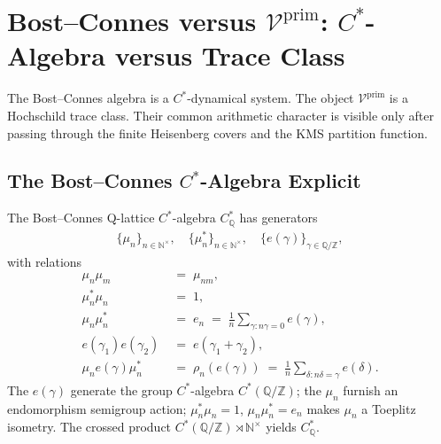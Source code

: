 \chapter{Bost--Connes versus \(\mathcal{V}^{\mathrm{prim}}\): \(C^{*}\)-Algebra versus Trace Class}
\label{v4-arith:connes-soibelman}

The Bost--Connes algebra is a \(C^*\)-dynamical system. The object
\(\mathcal V^{\mathrm{prim}}\) is a Hochschild trace class. Their
common arithmetic character is visible only after passing through the
finite Heisenberg covers and the KMS partition function.

\section{The Bost--Connes \(C^{*}\)-Algebra Explicit}
\label{v4-arith:cs:bost-connes-explicit}

\begin{definition}
\label{v4-arith:def:bost-connes-algebra}
The Bost--Connes Q-lattice \(C^{*}\)-algebra \(C_{\mathbb{Q}}^{*}\) has
generators
\begin{align}
\{\mu_{n}\}_{n\in\mathbb{N}^{\times}},\quad
\{\mu_{n}^{*}\}_{n\in\mathbb{N}^{\times}},\quad
\{e(\gamma)\}_{\gamma\in\mathbb{Q}/\mathbb{Z}},
\end{align}
with relations
\begin{align}
\mu_{n}\mu_{m}\;&=\;\mu_{nm}, \\
\mu_{n}^{*}\mu_{n}\;&=\;1, \\
\mu_{n}\mu_{n}^{*}\;&=\;e_{n}\;=\;\frac{1}{n}\sum_{\gamma:n\gamma=0}e(\gamma), \\
e(\gamma_{1})e(\gamma_{2})\;&=\;e(\gamma_{1}+\gamma_{2}), \\
\mu_{n}e(\gamma)\mu_{n}^{*}\;&=\;\rho_{n}(e(\gamma))\;=\;\frac{1}{n}\sum_{\delta:n\delta=\gamma}e(\delta).
\end{align}
The \(e(\gamma)\) generate the group \(C^{*}\)-algebra
\(C^{*}(\mathbb{Q}/\mathbb{Z})\); the \(\mu_{n}\) furnish an endomorphism
semigroup action; \(\mu_{n}^{*}\mu_{n}=1\), \(\mu_{n}\mu_{n}^{*}=e_{n}\)
makes \(\mu_{n}\) a Toeplitz isometry. The crossed product
\(C^{*}(\mathbb{Q}/\mathbb{Z})\rtimes\mathbb{N}^{\times}\) yields
\(C_{\mathbb{Q}}^{*}\).
\end{definition}

